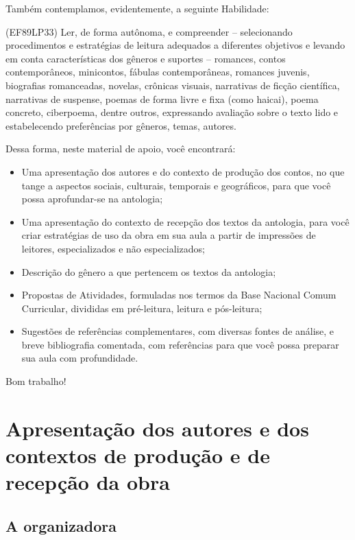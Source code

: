 Também contemplamos, evidentemente, a seguinte Habilidade:

(EF89LP33) Ler, de forma autônoma, e compreender – selecionando procedimentos e estratégias de leitura adequados a diferentes objetivos e levando em conta características dos gêneros e suportes – romances, contos contemporâneos, minicontos, fábulas contemporâneas, romances juvenis, biografias romanceadas, novelas, crônicas visuais, narrativas de ficção científica, narrativas de suspense, poemas de forma livre e fixa (como haicai), poema concreto, ciberpoema, dentre outros, expressando avaliação sobre o texto lido e estabelecendo preferências por gêneros, temas, autores.

Dessa forma, neste material de apoio, você encontrará:

\begin{itemize}
\item Uma apresentação dos autores e do contexto de produção dos contos, no
que tange a aspectos sociais, culturais, temporais e geográficos, para
que você possa aprofundar-se na antologia;

\item Uma apresentação do contexto de recepção dos textos da antologia, para você criar estratégias de uso da obra em sua aula a partir de impressões
de leitores, especializados e não especializados;

\item Descrição do gênero a que pertencem os textos da antologia;

\item Propostas de Atividades, formuladas nos termos da Base
Nacional Comum Curricular, divididas em pré-leitura, leitura e pós-leitura;

\item Sugestões de referências complementares, com diversas fontes de
análise, e breve bibliografia comentada, com referências 
para que você possa preparar sua aula com profundidade.
\end{itemize}

Bom trabalho!

\chapter{Apresentação dos autores e dos contextos de produção e de recepção da obra}

\section{A organizadora}

